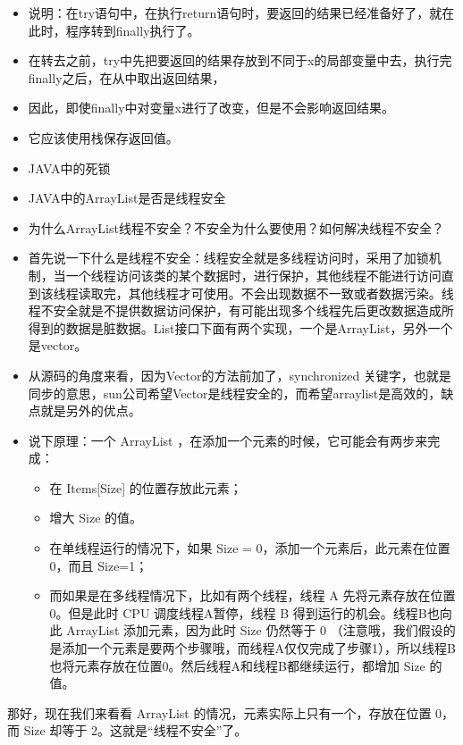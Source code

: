 \documentclass[9pt, b5paper]{article}
\begin{document}
\begin{itemize}
\item 说明：在try语句中，在执行return语句时，要返回的结果已经准备好了，就在此时，程序转到finally执行了。
\item 在转去之前，try中先把要返回的结果存放到不同于x的局部变量中去，执行完finally之后，在从中取出返回结果，
\item 因此，即使finally中对变量x进行了改变，但是不会影响返回结果。
\item 它应该使用栈保存返回值。

\item JAVA中的死锁
\item JAVA中的ArrayList是否是线程安全
\item 为什么ArrayList线程不安全？不安全为什么要使用？如何解决线程不安全？
\item 首先说一下什么是线程不安全：线程安全就是多线程访问时，采用了加锁机制，当一个线程访问该类的某个数据时，进行保护，其他线程不能进行访问直到该线程读取完，其他线程才可使用。不会出现数据不一致或者数据污染。线程不安全就是不提供数据访问保护，有可能出现多个线程先后更改数据造成所得到的数据是脏数据。List接口下面有两个实现，一个是ArrayList，另外一个是vector。
\item 从源码的角度来看，因为Vector的方法前加了，synchronized 关键字，也就是同步的意思，sun公司希望Vector是线程安全的，而希望arraylist是高效的，缺点就是另外的优点。
\item 说下原理：一个 ArrayList ，在添加一个元素的时候，它可能会有两步来完成：
\begin{itemize}
\item 在 Items[Size] 的位置存放此元素；
\item 增大 Size 的值。
\item 在单线程运行的情况下，如果 Size = 0，添加一个元素后，此元素在位置 0，而且 Size=1；
\item 而如果是在多线程情况下，比如有两个线程，线程 A 先将元素存放在位置 0。但是此时 CPU 调度线程A暂停，线程 B 得到运行的机会。线程B也向此 ArrayList 添加元素，因为此时 Size 仍然等于 0 （注意哦，我们假设的是添加一个元素是要两个步骤哦，而线程A仅仅完成了步骤1），所以线程B也将元素存放在位置0。然后线程A和线程B都继续运行，都增加 Size 的值。
\end{itemize}
\end{itemize}
那好，现在我们来看看 ArrayList 的情况，元素实际上只有一个，存放在位置 0，而 Size 却等于 2。这就是“线程不安全”了。
\end{document}
